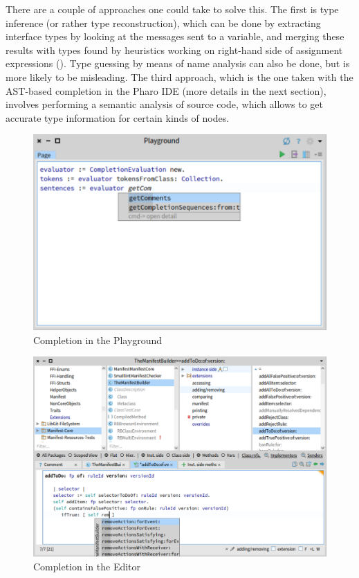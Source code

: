 There are a couple of approaches one could take to solve this. The first is type inference (or rather type reconstruction), which can be done by extracting interface types by looking at the messages sent to a variable, and merging these results with types found by heuristics working on right-hand side of assignment expressions (\cite{Pluq09a}). Type guessing by means of name analysis can also be done, but is more likely to be misleading. The third approach, which is the one taken with the AST-based completion in the Pharo IDE (more details in the next section), involves performing a semantic analysis of source code, which allows to get accurate type information for certain kinds of nodes.

\begin{figure}[H]
    \centering
    \includegraphics[width=0.9\linewidth]{images/completion1.png}
    \caption{Completion in the Playground}
    \label{fig:playground}
\end{figure}

\begin{figure}[H]
    \centering
    \includegraphics[width=0.9\linewidth]{images/completion2.png}
    \caption{Completion in the Editor}
    \label{fig:editor}
\end{figure}

